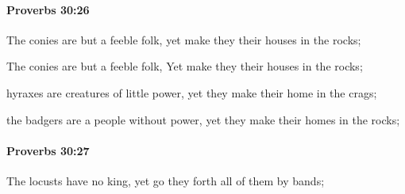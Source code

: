 		\paragraph{Proverbs 30:26} %
			\label{PROVERBS-30-26}

			The conies are but a feeble folk, yet make they their houses in the rocks;

			\begin{versebox}
					\item[BHS] 
					\item[ASV] The conies are but a feeble folk, Yet make they their houses in the rocks;
					\item[NIV] hyraxes are creatures of little power, yet they make their home in the crags;
					\item[NRSV] the badgers are a people without power, yet they make their homes in the rocks;
			\end{versebox}

		\paragraph{Proverbs 30:27} %
			\label{PROVERBS-30-27}

			The locusts have no king, yet go they forth all of them by bands;

